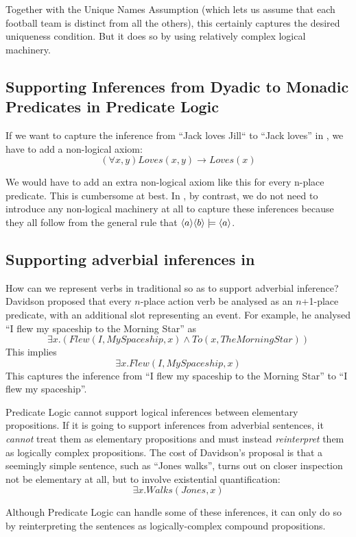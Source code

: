\NI Together with the Unique Names Assumption (which lets us assume
that each football team is distinct from all the others), this
certainly captures the desired uniqueness condition.  But it does so
by using relatively complex logical machinery.

\subsection{Supporting Inferences from Dyadic to Monadic Predicates in Predicate Logic}
If we want to capture the inference from ``Jack loves Jill`` to ``Jack loves'' in \fol{}, we have to add a non-logical axiom:
\[
(\forall x, y) Loves(x,y) \rightarrow Loves(x)
\]

\NI We would have to add an extra non-logical axiom like this for every
n-place predicate.  This is cumbersome at best.  In \ELABR{}, by
contrast, we do not need to introduce any non-logical machinery at all
to capture these inferences because they all follow from the general
rule that $\MAY{a} \MAY{b} \models \MAY{a}$.

\subsection{Supporting adverbial inferences in \fol{}}

\NI How can we represent verbs in traditional \fol{} so as to
support adverbial inference?  Davidson \cite{davidson2} proposed that
every $n$-place action verb be analysed as an $n$+1-place predicate,
with an additional slot representing an event.  For example, he
analysed ``I flew my spaceship to the Morning Star'' as
\[
\exists x. ( Flew(I, MySpaceship, x) \land To(x, TheMorningStar))
\]
This implies 
\[
\exists x.  Flew(I, MySpaceship, x)
\]
This captures the inference from ``I flew my spaceship to the Morning Star'' to ``I flew my spaceship''.

Predicate Logic cannot support logical inferences between elementary propositions. 
If it is going to support inferences from adverbial sentences, it \emph{cannot} treat them as elementary propositions and must instead \emph{reinterpret} them as logically complex propositions.
The cost of Davidson's proposal is that a seemingly simple sentence, such as ``Jones walks'', turns out on closer inspection not be elementary at all,  but to involve existential quantification:
\[
\exists x.  Walks(Jones, x)
\]

\NI Although Predicate Logic can handle some of these inferences, it
can only do so by reinterpreting the sentences as logically-complex
compound propositions.

